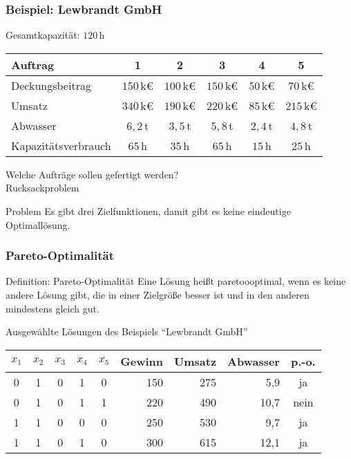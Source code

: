 \begin{frame}
 \frametitle{Beispiel: Lewbrandt GmbH}
 Gesamtkapazität: $120\,$h\\
 \begin{center}\footnotesize
  \begin{tabular}{lccccc}
  \toprule
  \bfseries Auftrag & \bfseries 1 & \bfseries 2 & \bfseries 3 & \bfseries 4 & \bfseries 5 \\
  \midrule
  Deckungsbeitrag & $150\,$k€ & $100\,$k€ & $150\,$k€ & $50\,$k€ & $70\,$k€\\
  Umsatz & $340\,$k€ & $190\,$k€ & $220\,$k€ & $85\,$k€ & $215\,$k€ \\
  Abwasser & $6,2\,$t & $3,5\,$t & $5,8\,$t & $2,4\,$t & $4,8\,$t \\
  Kapazitätsverbrauch &  $65\,$h & $35\,$h & $65\,$h & $15\,$h & $25\,$h\\
  \bottomrule
  \end{tabular}
 \end{center}
 
 Welche Aufträge sollen gefertigt werden? \\\textrightarrow{} Rucksackproblem
 
 \begin{block}{Problem}
  Es gibt drei Zielfunktionen, damit gibt es keine eindeutige Optimallösung.
 \end{block}
\end{frame}

\begin{frame}
 \frametitle{Pareto-Optimalität}
 \begin{block}{Definition: Pareto-Optimalität}
  Eine Lösung heißt paretoooptimal, wenn es keine andere Lösung gibt, die in einer Zielgröße besser ist und in den anderen mindestens gleich gut. 
 \end{block}
 
 \begin{block}{Ausgewählte Lösungen des Beispiels "`Lewbrandt GmbH"'}
  \footnotesize
 \centering
 \begin{tabular}{*{5}{c}rrrc}
  \toprule
  $x_1$ & $x_2$ & $x_3$ & $x_4$ & $x_5$ & \scriptsize Gewinn & \scriptsize Umsatz & \scriptsize Abwasser & p.-o. \\
  \midrule
  0&	1&	0&	1&	0&	150&	275&	5,9&	ja\\
  \alert{0}&	\alert{1}&	\alert{0}&	\alert{1}&	\alert{1}&	\alert{220}&	\alert{490}&	\alert{10,7}&	\alert{nein}\\
  1&	1&	0&	0&	0&	250&	530&	9,7&	ja\\
  1&	1&	0&	1&	0&	300&	615&	12,1&	ja\\
  \bottomrule
 \end{tabular}
 \end{block}

\end{frame}

